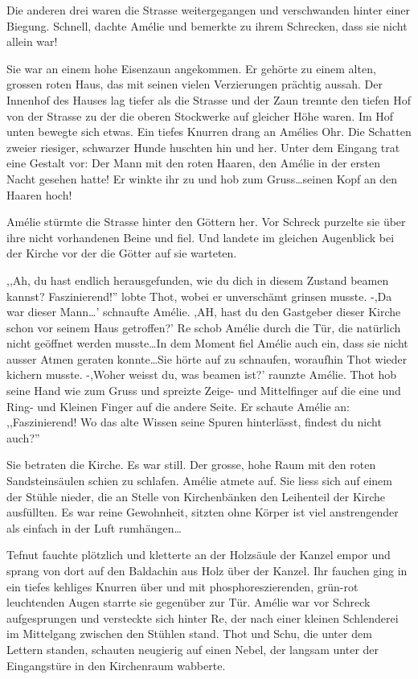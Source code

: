 \documentclass[11pt,titlepage,a5paper]{book}
\begin{document}
 Die anderen drei waren die Strasse weitergegangen und verschwanden hinter einer Biegung. Schnell, dachte Amélie und bemerkte zu ihrem Schrecken, dass sie nicht allein war!

Sie war an einem hohe Eisenzaun angekommen. Er gehörte zu einem alten, grossen roten Haus, das mit seinen vielen Verzierungen prächtig aussah. Der Innenhof des Hauses lag tiefer als die Strasse und der Zaun trennte den tiefen Hof von der Strasse zu der die oberen Stockwerke auf gleicher Höhe waren. Im Hof unten bewegte sich etwas. Ein tiefes Knurren drang an Amélies Ohr. Die Schatten zweier riesiger, schwarzer Hunde huschten hin und her. Unter dem Eingang trat eine Gestalt vor: Der Mann mit den roten Haaren, den Amélie in der ersten Nacht gesehen hatte! Er winkte ihr zu und hob zum Gruss\dots seinen Kopf an den Haaren hoch!

Amélie stürmte die Strasse hinter den Göttern her. Vor Schreck purzelte sie über ihre nicht vorhandenen Beine und fiel. Und landete im gleichen Augenblick bei der Kirche vor der die Götter auf sie warteten.

,,Ah, du hast endlich herausgefunden, wie du dich in diesem Zustand beamen kannst? Faszinierend!'' lobte Thot, wobei er unverschämt grinsen musste. -,Da war dieser Mann\dots' schnaufte Amélie. ,AH, hast du den Gastgeber dieser Kirche schon vor seinem Haus getroffen?' Re schob Amélie durch die Tür, die natürlich nicht geöffnet werden musste\dots In dem Moment fiel Amélie auch ein, dass sie nicht ausser Atmen geraten konnte\dots Sie hörte auf zu schnaufen, woraufhin Thot wieder kichern musste. -,Woher weisst du, was beamen ist?' raunzte Amélie. Thot hob seine Hand wie zum Gruss und spreizte Zeige- und Mittelfinger auf die eine und Ring- und Kleinen Finger auf die andere Seite. Er schaute Amélie an: ,,Faszinierend! Wo das alte Wissen seine Spuren hinterlässt, findest du nicht auch?''

Sie betraten die Kirche. Es war still. Der grosse, hohe Raum mit den roten Sandsteinsäulen schien zu schlafen. Amélie atmete auf. Sie liess sich auf einem der Stühle nieder, die an Stelle von Kirchenbänken den Leihenteil der Kirche ausfüllten. Es war reine Gewohnheit, sitzten ohne Körper ist viel anstrengender als einfach in der Luft rumhängen\dots

Tefnut fauchte plötzlich und kletterte an der Holzsäule der Kanzel empor und sprang von dort auf den Baldachin aus Holz über der Kanzel. Ihr fauchen ging in ein tiefes kehliges Knurren über und mit phosphoreszierenden, grün-rot leuchtenden Augen starrte sie gegenüber zur Tür. Amélie war vor Schreck aufgesprungen und versteckte sich hinter Re, der nach einer kleinen Schlenderei im Mittelgang zwischen den Stühlen stand. Thot und Schu, die unter dem Lettern standen, schauten neugierig auf einen Nebel, der langsam unter der Eingangstüre in den Kirchenraum wabberte.
\end{document}
